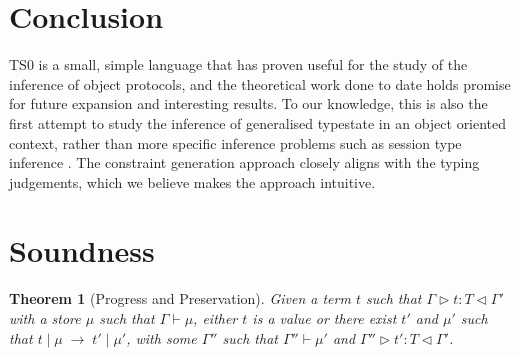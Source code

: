 \documentclass[preprint]{sigplanconf}
\newtheorem{thm}{Theorem}
\newcommand{\typerule}[4]{#1 \triangleright #2 : #3 \triangleleft #4}
\newcommand{\oprule}[4]{#1 \mid #2\;\longrightarrow\;#3 \mid #4}
\begin{document}
\section{Conclusion}

TS0 is a small, simple language that has proven useful
for the study of the inference of object protocols, and the theoretical work
done to date holds promise for future expansion and interesting results. 
To our knowledge, this is also the first attempt to study the inference
of generalised typestate in an object oriented context, rather than
more specific inference problems such as session type inference
\cite{Collingbourne2010}. The
constraint generation approach closely aligns with the typing judgements,
which we believe makes the approach intuitive.

\appendix

\section{Soundness}

\begin{thm}[Progress and Preservation]
Given a term $t$ such that $\typerule{\Gamma}{t}{T}{\Gamma'}$
with a store $\mu$ such that $\Gamma \vdash \mu$, either $t$ is a value or 
there exist $t'$ and $\mu'$ such that
$\oprule{t}{\mu}{t'}{\mu'}$, with some $\Gamma''$ such that
$\Gamma'' \vdash \mu'$ and $\typerule{\Gamma''}{t'}{T}{\Gamma'}$.
\end{thm}
\end{document}
